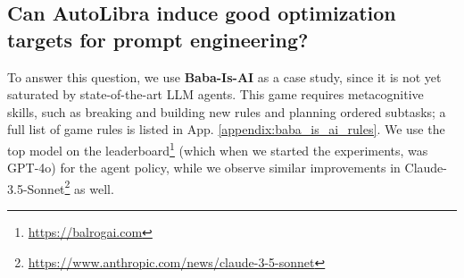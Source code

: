 
\subsection{Can AutoLibra induce good optimization targets for prompt
engineering?}
\label{sec:Baba-Is-AI}

To answer this question, we use \textbf{Baba-Is-AI} \citep{cloos2024babaaibreakrules, paglieri2024balrog}
as a case study, since it is not yet saturated by state-of-the-art LLM agents. This
game requires metacognitive skills, such as breaking and building new rules and
planning ordered subtasks; a full list of game rules is listed in App.
\ref{appendix:baba_is_ai_rules}. We use the top model on the leaderboard\footnote{\url{https://balrogai.com}}
(which when we started the experiments, was GPT-4o) \citep{openai2024gpt4ocard}
for the agent policy, while we observe similar improvements in Claude-3.5-Sonnet\footnote{\url{https://www.anthropic.com/news/claude-3-5-sonnet}}
as well.



